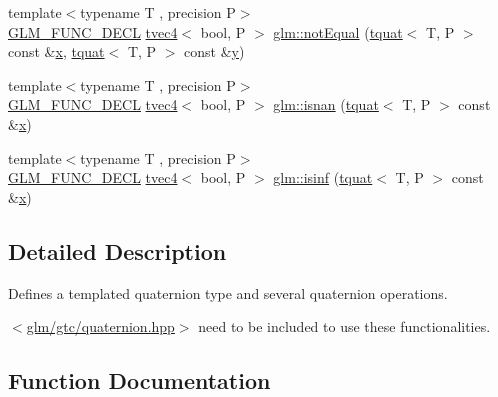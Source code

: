 \begin{DoxyCompactItemize}
\item 
{\footnotesize template$<$typename T , precision P$>$ }\\\mbox{\hyperlink{setup_8hpp_ab2d052de21a70539923e9bcbf6e83a51}{G\+L\+M\+\_\+\+F\+U\+N\+C\+\_\+\+D\+E\+CL}} \mbox{\hyperlink{structglm_1_1tvec4}{tvec4}}$<$ bool, P $>$ \mbox{\hyperlink{group__gtc__quaternion_ga484c4633f7c05d8e29ee8b452350f539}{glm\+::not\+Equal}} (\mbox{\hyperlink{structglm_1_1tquat}{tquat}}$<$ T, P $>$ const \&\mbox{\hyperlink{glad_8h_a92d0386e5c19fb81ea88c9f99644ab1d}{x}}, \mbox{\hyperlink{structglm_1_1tquat}{tquat}}$<$ T, P $>$ const \&\mbox{\hyperlink{glad_8h_a66ddd433d2cacfe27f5906b7e86faeed}{y}})
\item 
{\footnotesize template$<$typename T , precision P$>$ }\\\mbox{\hyperlink{setup_8hpp_ab2d052de21a70539923e9bcbf6e83a51}{G\+L\+M\+\_\+\+F\+U\+N\+C\+\_\+\+D\+E\+CL}} \mbox{\hyperlink{structglm_1_1tvec4}{tvec4}}$<$ bool, P $>$ \mbox{\hyperlink{group__gtc__quaternion_gad2fc52dd4ba5ff79cc56b3e0f9c092ed}{glm\+::isnan}} (\mbox{\hyperlink{structglm_1_1tquat}{tquat}}$<$ T, P $>$ const \&\mbox{\hyperlink{glad_8h_a92d0386e5c19fb81ea88c9f99644ab1d}{x}})
\item 
{\footnotesize template$<$typename T , precision P$>$ }\\\mbox{\hyperlink{setup_8hpp_ab2d052de21a70539923e9bcbf6e83a51}{G\+L\+M\+\_\+\+F\+U\+N\+C\+\_\+\+D\+E\+CL}} \mbox{\hyperlink{structglm_1_1tvec4}{tvec4}}$<$ bool, P $>$ \mbox{\hyperlink{group__gtc__quaternion_ga0a850f06736d25887536d0da88e63c70}{glm\+::isinf}} (\mbox{\hyperlink{structglm_1_1tquat}{tquat}}$<$ T, P $>$ const \&\mbox{\hyperlink{glad_8h_a92d0386e5c19fb81ea88c9f99644ab1d}{x}})
\end{DoxyCompactItemize}


\subsection{Detailed Description}
Defines a templated quaternion type and several quaternion operations. 

$<$\mbox{\hyperlink{gtc_2quaternion_8hpp}{glm/gtc/quaternion.\+hpp}}$>$ need to be included to use these functionalities. 

\subsection{Function Documentation}
\mbox{\label{group__gtc__quaternion_gad4a4448baedb198b2b1e7880d2544dc9}} 
